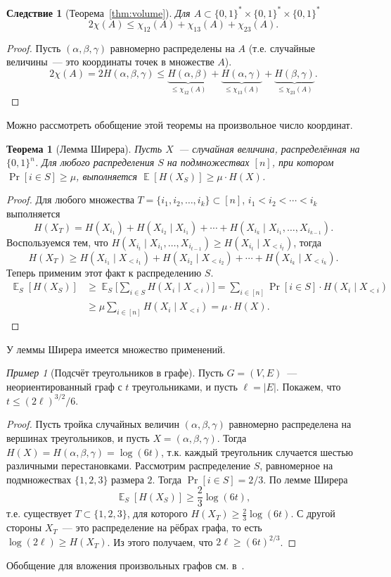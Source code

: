 \documentclass[12pt]{article}
\newcommand{\bits}{\{0,1\}}
\newcommand{\bitstr}{\bits^*}
\newcommand{\seqn}[2]{{#1}_1,{#1}_2,\dotsc,{#1}_{#2}}
\DeclareMathOperator*{\E}{\mathbb{E}}
\theoremstyle{definition}
\theoremstyle{plain}
\newtheorem{theorem}{Теорема}[section]
\newtheorem{corollary}{Следствие}[section]
\theoremstyle{remark}
\newtheorem{example}{Пример}[section]
\begin{document}
\begin{corollary}[Теорема~\ref{thm:volume}]
Для \(A\subset\bitstr\times\bitstr\times\bitstr\)
\[2\chi(A) \le \chi_{12}(A) + \chi_{13}(A) + \chi_{23}(A).\]
\end{corollary}
\begin{proof}
		Пусть $(\alpha,\beta,\gamma)$ равномерно распределены на $A$ (т.е. случайные величины~--- это координаты точек в
		множестве $A$).
    \[
        2\chi(A) = 2H(\alpha,\beta,\gamma)\le 
        \underbrace{H(\alpha,\beta) }_{\le\chi_{12}(A)} + 
        \underbrace{H(\alpha,\gamma)}_{\le\chi_{13}(A)} + 
        \underbrace{H(\beta,\gamma) }_{\le\chi_{23}(A)}.
    \]
\end{proof}
Можно рассмотреть обобщение этой теоремы на произвольное число координат.
\begin{theorem}[Лемма Ширера]
	Пусть $X$~--- случайная величина, распределённая на $\bits^n$.
	Для любого распределения $S$ на подмножествах $[n]$, при котором 
	$\Pr[i\in S]\ge\mu$, выполняется $\E[H(X_S)]\ge \mu\cdot H(X)$.
\end{theorem}
\begin{proof}
	Для любого множества $T=\{\seqn{i}{k}\}\subset [n]$, 
	$i_1<i_2<\dotsb<i_k$ выполняется
	\[
		H(X_T) = H(X_{i_1}) + H(X_{i_2}\mid X_{i_1}) + \dotsb + H(X_{i_k}\mid X_{i_1}, \dotsc, X_{i_{k-1}}).
	\]
    Воспользуемся тем, что $H(X_{i_t}\mid X_{i_1},\dotsc,X_{i_{t-1}}) \ge H(X_{i_t}\mid X_{<i_t})$, тогда 
	\[
		H(X_T) 
		\ge H(X_{i_1}\mid X_{<i_1}) + H(X_{i_2}\mid X_{<i_2}) + \dotsb + H(X_{i_k}\mid X_{<i_k}).
	\]
	Теперь применим этот факт к распределению $S$.
	\begin{align*}
		\E_S[H(X_S)] 
		&\ge \E_S\biggl[\sum_{i\in S} H(X_i\mid X_{<i})\biggr]
		 = \sum_{i\in[n]}\Pr[i\in S]\cdot H(X_i\mid X_{<i})\\
		&\ge \mu\sum_{i \in [n]} H(X_i\mid X_{<i}) = \mu\cdot H(X).
	\end{align*}
\end{proof}
У леммы Ширера имеется множество применений. 
\begin{example}[Подсчёт треугольников в графе]
	Пусть $G=(V,E)$~--- неориентированный граф с $t$ треугольниками, и пусть $\ell = |E|$. Покажем, что $t\le
	(2\ell)^{3/2} / 6$.
	\begin{proof}
		Пусть тройка случайных величин $(\alpha,\beta,\gamma)$ равномерно распределена на вершинах треугольников, и пусть $X = (\alpha,\beta,\gamma)$. Тогда $H(X) = H(\alpha,\beta,\gamma) =
		\log(6t)$, т.к. каждый треугольник случается шестью различными перестановками. Рассмотрим распределение $S$,
		равномерное на подмножествах $\{1,2,3\}$ размера $2$. Тогда $\Pr[i\in S] = 2/3$. По лемме Ширера 
	\[
		\E_S[H(X_S)]\ge\frac23\log(6t),
	\]
	т.е. существует $T\subset \{1,2,3\}$, для которого $H(X_T)\ge \frac23 \log(6t)$.
	С другой стороны $X_T$~--- это распределение на рёбрах графа, то есть $\log(2\ell)\ge H(X_T)$. Из этого получаем,
	что $2\ell \ge (6t)^{2/3}$.
	\end{proof}
	Обобщение для вложения произвольных графов см. в~\cite{rao10}.
\end{example}
\end{document}
